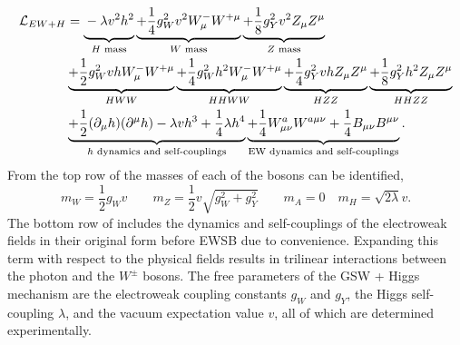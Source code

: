 \begin{equation}
	\label{eq:higgs_lagrangian_full}
	\resizebox{.99\hsize}{!}{$
			\begin{aligned}
				\mathcal{L}_{EW+H}
				 & = \underbrace{\vphantom{\frac{}{}} - \lambda v^2 h^2}_{H \text{ mass}}
				\underbrace{+\frac{1}{4} g_W^2 v^2 W^-_\mu W^{+\mu}}_{W \text{ mass}}
				\underbrace{+\frac{1}{8} g_Y^2 v^2 Z_\mu Z^\mu}_{Z \text{ mass}}                                                                                 \\
				 & \underbrace{+\frac{1}{2} g_W^2 v h W^-_\mu W^{+\mu}}_{HWW}
				\underbrace{+\frac{1}{4} g_W^2 h^2 W^-_\mu W^{+\mu}}_{HHWW}
				\underbrace{+\frac{1}{4} g_Y^2 v h Z_\mu Z^\mu}_{HZZ}
				\underbrace{+\frac{1}{8} g_Y^2 h^2 Z_\mu Z^\mu}_{HHZZ}                                                                                           \\
				 & \underbrace{+\frac{1}{2}(\partial_{\mu} h)(\partial^{\mu} h) - \lambda v h^3 + \frac{1}{4}\lambda h^4}_{h\text{ dynamics and self-couplings}}
				\underbrace{+\frac{1}{4} W^a_{\mu\nu} W^{a\mu\nu} + \frac{1}{4} B_{\mu\nu} B^{\mu\nu}}_{\text{EW dynamics and self-couplings}}.
			\end{aligned}
		$}
\end{equation}
From the top row of  the masses of each of the bosons can be identified,
\begin{equation}
	\label{eq:ew_masses}
	m_W = \frac{1}{2} g_W v
	\qquad
	m_Z = \frac{1}{2} v \sqrt{g_W^2 + g_Y^2}
	\qquad
	m_A = 0
	\quad
	m_H = \sqrt{2 \lambda} v.
\end{equation}
The bottom row of  includes the dynamics and self-couplings of the electroweak fields in their original form before EWSB due to convenience.
Expanding this term with respect to the physical fields results in trilinear interactions between the photon and the $W^\pm$ bosons.
The free parameters of the GSW + Higgs mechanism are the electroweak coupling constants $g_W$ and $g_Y$, the Higgs self-coupling $\lambda$, and the vacuum expectation value $v$, all of which are determined experimentally.

